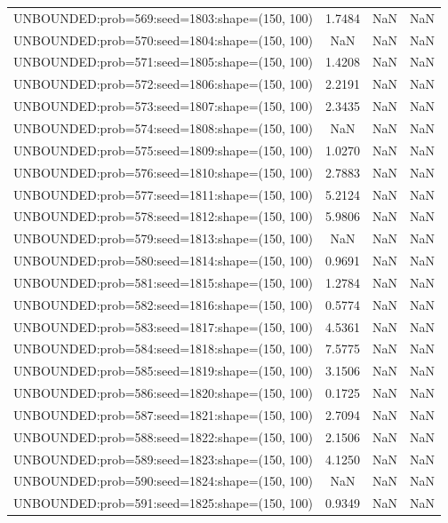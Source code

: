\begin{longtable}{lccc}
UNBOUNDED:prob=569:seed=1803:shape=(150, 100) &  1.7484 &   NaN &    NaN \\
UNBOUNDED:prob=570:seed=1804:shape=(150, 100) &     NaN &   NaN &    NaN \\
UNBOUNDED:prob=571:seed=1805:shape=(150, 100) &  1.4208 &   NaN &    NaN \\
UNBOUNDED:prob=572:seed=1806:shape=(150, 100) &  2.2191 &   NaN &    NaN \\
UNBOUNDED:prob=573:seed=1807:shape=(150, 100) &  2.3435 &   NaN &    NaN \\
UNBOUNDED:prob=574:seed=1808:shape=(150, 100) &     NaN &   NaN &    NaN \\
UNBOUNDED:prob=575:seed=1809:shape=(150, 100) &  1.0270 &   NaN &    NaN \\
UNBOUNDED:prob=576:seed=1810:shape=(150, 100) &  2.7883 &   NaN &    NaN \\
UNBOUNDED:prob=577:seed=1811:shape=(150, 100) &  5.2124 &   NaN &    NaN \\
UNBOUNDED:prob=578:seed=1812:shape=(150, 100) &  5.9806 &   NaN &    NaN \\
UNBOUNDED:prob=579:seed=1813:shape=(150, 100) &     NaN &   NaN &    NaN \\
UNBOUNDED:prob=580:seed=1814:shape=(150, 100) &  0.9691 &   NaN &    NaN \\
UNBOUNDED:prob=581:seed=1815:shape=(150, 100) &  1.2784 &   NaN &    NaN \\
UNBOUNDED:prob=582:seed=1816:shape=(150, 100) &  0.5774 &   NaN &    NaN \\
UNBOUNDED:prob=583:seed=1817:shape=(150, 100) &  4.5361 &   NaN &    NaN \\
UNBOUNDED:prob=584:seed=1818:shape=(150, 100) &  7.5775 &   NaN &    NaN \\
UNBOUNDED:prob=585:seed=1819:shape=(150, 100) &  3.1506 &   NaN &    NaN \\
UNBOUNDED:prob=586:seed=1820:shape=(150, 100) &  0.1725 &   NaN &    NaN \\
UNBOUNDED:prob=587:seed=1821:shape=(150, 100) &  2.7094 &   NaN &    NaN \\
UNBOUNDED:prob=588:seed=1822:shape=(150, 100) &  2.1506 &   NaN &    NaN \\
UNBOUNDED:prob=589:seed=1823:shape=(150, 100) &  4.1250 &   NaN &    NaN \\
UNBOUNDED:prob=590:seed=1824:shape=(150, 100) &     NaN &   NaN &    NaN \\
UNBOUNDED:prob=591:seed=1825:shape=(150, 100) &  0.9349 &   NaN &    NaN \\

\end{longtable}
